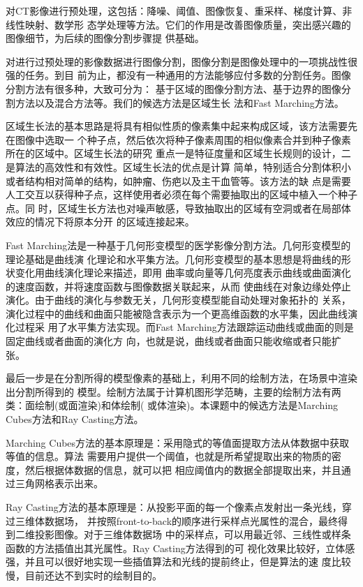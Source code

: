 对CT影像进行预处理，这包括：降噪、阈值、图像恢复、重采样、梯度计算、非线性映射、数学形
态学处理等方法。它们的作用是改善图像质量，突出感兴趣的图像细节，为后续的图像分割步骤提
供基础。

对进行过预处理的影像数据进行图像分割，图像分割是图像处理中的一项挑战性很强的任务。到目
前为止，都没有一种通用的方法能够应付多数的分割任务。图像分割方法有很多种，大致可分为：
基于区域的图像分割方法、基于边界的图像分割方法以及混合方法等。我们的候选方法是区域生长
法和Fast Marching方法。

区域生长法的基本思路是将具有相似性质的像素集中起来构成区域，该方法需要先在图像中选取一
个种子点，然后依次将种子像素周围的相似像素合并到种子像素所在的区域中。区域生长法的研究
重点一是特征度量和区域生长规则的设计，二是算法的高效性和有效性。区域生长法的优点是计算
简单，特别适合分割体积小或者结构相对简单的结构，如肿瘤、伤疤以及主干血管等。该方法的缺
点是需要人工交互以获得种子点，这样使用者必须在每个需要抽取出的区域中植入一个种子点。同
时，区域生长方法也对噪声敏感，导致抽取出的区域有空洞或者在局部体效应的情况下将原本分开
的区域连接起来。

Fast Marching法是一种基于几何形变模型的医学影像分割方法。几何形变模型的理论基础是曲线演
化理论和水平集方法。几何形变模型的基本思想是将曲线的形状变化用曲线演化理论来描述，即用
曲率或向量等几何亮度表示曲线或曲面演化的速度函数，并将速度函数与图像数据关联起来，从而
使曲线在对象边缘处停止演化。由于曲线的演化与参数无关，几何形变模型能自动处理对象拓扑的
关系，演化过程中的曲线和曲面只能被隐含表示为一个更高维函数的水平集，因此曲线演化过程采
用了水平集方法实现。而Fast Marching方法跟踪运动曲线或曲面的则是固定曲线或者曲面的演化方
向，也就是说，曲线或者曲面只能收缩或者只能扩张。

最后一步是在分割所得的模型像素的基础上，利用不同的绘制方法，在场景中渲染出分割所得到的
模型。绘制方法属于计算机图形学范畴，主要的绘制方法有两类：面绘制(或面渲染)和体绘制(
或体渲染)。本课题中的候选方法是Marching Cubes方法和Ray Casting方法。

Marching Cubes方法的基本原理是：采用隐式的等值面提取方法从体数据中获取等值的信息。算法
需要用户提供一个阈值，也就是所希望提取出来的物质的密度，然后根据体数据的信息，就可以把
相应阈值内的数据全部提取出来，并且通过三角网格表示出来。

Ray Casting方法的基本原理是：从投影平面的每一个像素点发射出一条光线，穿过三维体数据场，
并按照front-to-back的顺序进行采样点光属性的混合，最终得到二维投影图像。对于三维体数据场
中的采样点，可以用最近邻、三线性或样条函数的方法插值出其光属性。Ray Casting方法得到的可
视化效果比较好，立体感强，并且可以很好地实现一些插值算法和光线的提前终止，但是算法的速
度比较慢，目前还达不到实时的绘制目的。

